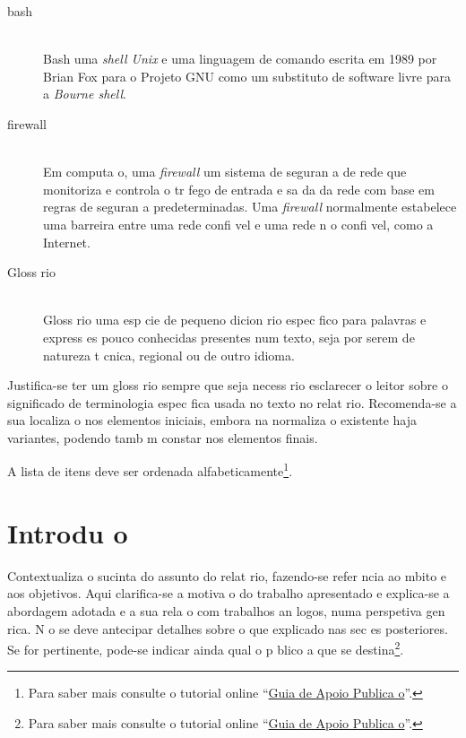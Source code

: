 \documentclass{article}
\begin{document}
\begin{description}
\item[bash] \hfill \\
  Bash   uma \emph{shell Unix} e uma linguagem de comando escrita 
  em 1989 por Brian Fox para o Projeto GNU como um substituto de 
  software livre para a \emph{Bourne shell}.
\item[firewall] \hfill \\
  Em computa o, uma \emph{firewall}   um sistema de seguran a de rede 
  que monitoriza e controla o tr fego de entrada e sa da da rede 
  com base em regras de seguran a predeterminadas.
  Uma \emph{firewall} normalmente estabelece uma barreira entre uma 
  rede confi vel e uma rede n o confi vel, como a Internet.
\item[Gloss rio] \hfill \\
  Gloss rio   uma esp cie de pequeno dicion rio espec fico para
  palavras e express es pouco conhecidas presentes num texto, seja
  por serem de natureza t cnica, regional ou de outro idioma.
\end{description}

\begin{infoopt}
Justifica-se ter um gloss rio sempre que seja necess rio esclarecer o leitor sobre o significado de terminologia espec fica usada no texto no relat rio.
Recomenda-se a sua localiza o nos elementos iniciais, embora na
normaliza o existente haja variantes, podendo tamb m constar nos
elementos finais.

A lista de itens deve ser ordenada alfabeticamente\footnote{%
Para saber mais consulte o tutorial online 
``\href{https://docs.google.com/document/d/1TDC1behVq8x7fQL4CcPEEh_np5GXviJevQxnQ9gbiJs/edit}
{Guia de Apoio   Publica o}''.}.
\end{infoopt}


\chapter{Introdu o}

\pagestyle{fancy}
\setcounter{page}{1}

\begin{info}
Contextualiza o sucinta do assunto do relat rio, fazendo-se
refer ncia ao  mbito e aos objetivos.
Aqui clarifica-se a motiva o do trabalho apresentado e explica-se a
abordagem adotada e a sua rela o com trabalhos an logos, numa
perspetiva gen rica.
N o se deve antecipar detalhes sobre o que   explicado nas sec es
posteriores. 
Se for pertinente, pode-se indicar ainda qual o p blico a que se
destina\footnote{%
Para saber mais consulte o tutorial online 
``\href{https://docs.google.com/document/d/1TDC1behVq8x7fQL4CcPEEh_np5GXviJevQxnQ9gbiJs/edit}
{Guia de Apoio   Publica o}''.}.
\end{info}
\end{document}
